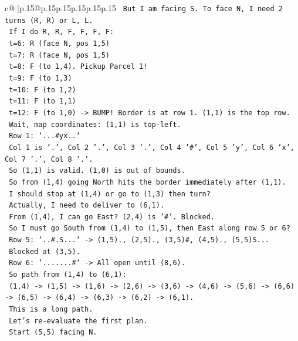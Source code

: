 \documentclass{article}
\begin{document}
{\begin{supertabular}{c@{$\;$}|p{.15\linewidth}@{}p{.15\linewidth}p{.15\linewidth}p{.15\linewidth}p{.15\linewidth}p{.15\linewidth}}
{{{\texttt{      But I am facing S. To face N, I need 2 turns (R, R) or L, L.} \\
\texttt{      If I do R, R, F, F, F, F:} \\
\texttt{      t=6: R (face N, pos 1,5)} \\
\texttt{      t=7: R (face N, pos 1,5)} \\
\texttt{      t=8: F (to 1,4). Pickup Parcel 1!} \\
\texttt{      t=9: F (to 1,3)} \\
\texttt{      t=10: F (to 1,2)} \\
\texttt{      t=11: F (to 1,1)} \\
\texttt{      t=12: F (to 1,0) {-}> BUMP! Border is at row 1. (1,1) is the top row.} \\
\texttt{      Wait, map coordinates: (1,1) is top{-}left.} \\
\texttt{      Row 1: `...\#yx..`} \\
\texttt{      Col 1 is '.', Col 2 '.', Col 3 '.', Col 4 '\#', Col 5 'y', Col 6 'x', Col 7 '.', Col 8 '.'.} \\
\texttt{      So (1,1) is valid. (1,0) is out of bounds.} \\
\texttt{      So from (1,4) going North hits the border immediately after (1,1).} \\
\texttt{      I should stop at (1,4) or go to (1,3) then turn?} \\
\texttt{      Actually, I need to deliver to (6,1).} \\
\texttt{      From (1,4), I can go East? (2,4) is '\#'. Blocked.} \\
\texttt{      So I must go South from (1,4) to (1,5), then East along row 5 or 6?} \\
\texttt{      Row 5: `..\#.S...` {-}> (1,5)., (2,5)., (3,5)\#, (4,5)., (5,5)S...} \\
\texttt{      Blocked at (3,5).} \\
\texttt{      Row 6: `.......\#` {-}> All open until (8,6).} \\
\texttt{      So path from (1,4) to (6,1):} \\
\texttt{      (1,4) {-}> (1,5) {-}> (1,6) {-}> (2,6) {-}> (3,6) {-}> (4,6) {-}> (5,6) {-}> (6,6) {-}> (6,5) {-}> (6,4) {-}> (6,3) {-}> (6,2) {-}> (6,1).} \\
\texttt{      This is a long path.} \\
\texttt{      Let's re{-}evaluate the first plan.} \\
\texttt{      Start (5,5) facing N.} \\
}}}
\end{supertabular}}
\end{document}
